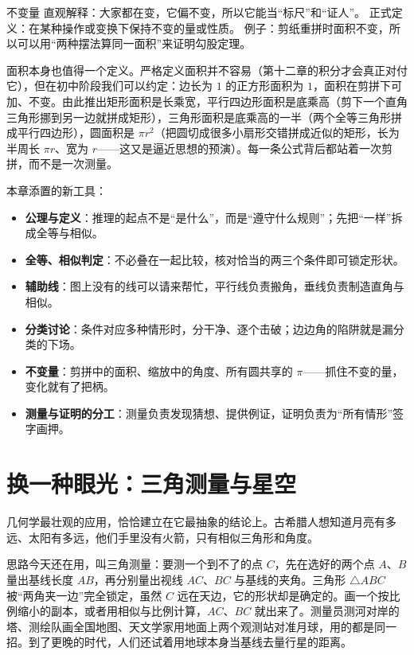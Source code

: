 \begin{shuyu}{不变量}
直观解释：大家都在变，它偏不变，所以它能当“标尺”和“证人”。
正式定义：在某种操作或变换下保持不变的量或性质。
例子：剪纸重拼时面积不变，所以可以用“两种摆法算同一面积”来证明勾股定理。
\end{shuyu}

面积本身也值得一个定义。严格定义面积并不容易（第十二章的积分才会真正对付它），但在初中阶段我们可以约定：边长为 $1$ 的正方形面积为 $1$，面积在剪拼下可加、不变。由此推出矩形面积是长乘宽，平行四边形面积是底乘高（剪下一个直角三角形挪到另一边就拼成矩形），三角形面积是底乘高的一半（两个全等三角形拼成平行四边形），圆面积是 $\pi r^2$（把圆切成很多小扇形交错拼成近似的矩形，长为半周长 $\pi r$、宽为 $r$——这又是逼近思想的预演）。每一条公式背后都站着一次剪拼，而不是一次测量。

\begin{toolbox}
本章添置的新工具：
\begin{itemize}
\item \textbf{公理与定义}：推理的起点不是“是什么”，而是“遵守什么规则”；先把“一样”拆成全等与相似。
\item \textbf{全等、相似判定}：不必叠在一起比较，核对恰当的两三个条件即可锁定形状。
\item \textbf{辅助线}：图上没有的线可以请来帮忙，平行线负责搬角，垂线负责制造直角与相似。
\item \textbf{分类讨论}：条件对应多种情形时，分干净、逐个击破；边边角的陷阱就是漏分类的下场。
\item \textbf{不变量}：剪拼中的面积、缩放中的角度、所有圆共享的 $\pi$——抓住不变的量，变化就有了把柄。
\item \textbf{测量与证明的分工}：测量负责发现猜想、提供例证，证明负责为“所有情形”签字画押。
\end{itemize}
\end{toolbox}

\section{换一种眼光：三角测量与星空}

几何学最壮观的应用，恰恰建立在它最抽象的结论上。古希腊人想知道月亮有多远、太阳有多远，他们手里没有火箭，只有相似三角形和角度。

思路今天还在用，叫三角测量：要测一个到不了的点 $C$，先在选好的两个点 $A$、$B$ 量出基线长度 $AB$，再分别量出视线 $AC$、$BC$ 与基线的夹角。三角形 $\triangle ABC$ 被“两角夹一边”完全锁定，虽然 $C$ 远在天边，它的形状却是确定的。画一个按比例缩小的副本，或者用相似与比例计算，$AC$、$BC$ 就出来了。测量员测河对岸的塔、测绘队画全国地图、天文学家用地面上两个观测站对准月球，用的都是同一招。到了更晚的时代，人们还试着用地球本身当基线去量行星的距离。


